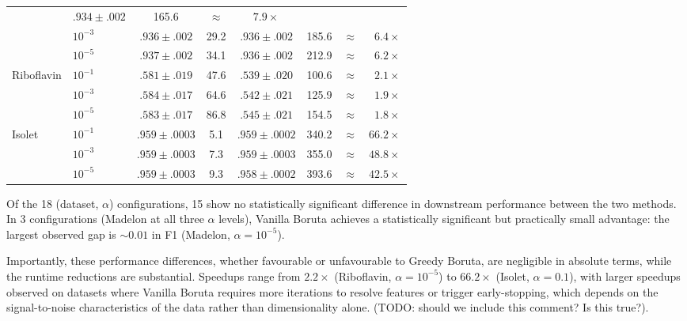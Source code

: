 \documentclass[runningheads]{llncs}
\begin{document}
\begin{table}[H]
\begin{tabular}{ll cc cc c r}
               & $.934 \pm .002$ & 165.6
               & $\approx$ & $7.9\times$ \\
  & $10^{-3}$  & $.936 \pm .002$ & 29.2
               & $.936 \pm .002$ & 185.6
               & $\approx$ & $6.4\times$ \\
  & $10^{-5}$  & $.937 \pm .002$ & 34.1
               & $.936 \pm .002$ & 212.9
               & $\approx$ & $6.2\times$ \\
\midrule
\multirow{3}{*}{Riboflavin}
  & $10^{-1}$  & $.581 \pm .019$ & 47.6
               & $.539 \pm .020$ & 100.6
               & $\approx$ & $2.1\times$ \\
  & $10^{-3}$  & $.584 \pm .017$ & 64.6
               & $.542 \pm .021$ & 125.9
               & $\approx$ & $1.9\times$ \\
  & $10^{-5}$  & $.583 \pm .017$ & 86.8
               & $.545 \pm .021$ & 154.5
               & $\approx$ & $1.8\times$ \\
\midrule
\multirow{3}{*}{Isolet}
  & $10^{-1}$  & $.959 \pm .0003$ & 5.1
               & $.959 \pm .0002$ & 340.2
               & $\approx$ & $66.2\times$ \\
  & $10^{-3}$  & $.959 \pm .0003$ & 7.3
               & $.959 \pm .0003$ & 355.0
               & $\approx$ & $48.8\times$ \\
  & $10^{-5}$  & $.959 \pm .0003$ & 9.3
               & $.958 \pm .0002$ & 393.6
               & $\approx$ & $42.5\times$ \\
\bottomrule
\end{tabular}
\end{table}
 
Of the 18 (dataset, $\alpha$) configurations, 15 show no statistically significant difference in downstream performance between the two methods. In 3 configurations (Madelon at all three $\alpha$ levels), Vanilla Boruta achieves a statistically significant but practically small advantage: the largest observed gap is ${\sim}0.01$ in F1 (Madelon, $\alpha = 10^{-5}$).

Importantly, these performance differences, whether favourable or unfavourable to Greedy Boruta, are negligible in absolute terms, while the runtime reductions are substantial. Speedups range from $2.2\times$ (Riboflavin, $\alpha = 10^{-5}$) to $66.2\times$ (Isolet, $\alpha = 0.1$), with larger speedups observed on datasets where Vanilla Boruta requires more iterations to resolve features or trigger early-stopping, which depends on the signal-to-noise characteristics of the data rather than dimensionality alone. (TODO: should we include this comment? Is this true?). 
\end{document}
